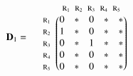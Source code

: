 \documentclass[a4paper,10pt]{article}
\begin{document}
\begin{equation*}
\mathbf{D}_1 = \; \; \; \; \; \begin{matrix}
 & 

\begin{matrix}
\text{\scriptsize $\mathrm{R}_1$} \!\!\! & 
\text{\scriptsize $\mathrm{R}_2$} \!\!\! & 
\text{\scriptsize $\mathrm{R}_3$} \!\!\! & 
\text{\scriptsize $\mathrm{R}_4$} \!\!\! & 
\text{\scriptsize $\mathrm{R}_5$}
\end{matrix}

\\ 

\begin{matrix*}[l]
\text{\scriptsize $\mathrm{R}_1$} \!\!\! \\
\text{\scriptsize $\mathrm{R}_2$} \!\!\! \\
\text{\scriptsize $\mathrm{R}_3$} \!\!\! \\
\text{\scriptsize $\mathrm{R}_4$} \!\!\! \\
\text{\scriptsize $\mathrm{R}_5$} \!\!\!
\end{matrix*}

& 

\begin{pmatrix}
0 & * & 0 & * & * \\
1 & * & 0 & * & * \\
0 & * & 1 & * & * \\
0 & * & 0 & * & * \\
0 & * & 0 & * & *
\end{pmatrix}

\end{matrix}
\end{equation*}

\bigskip
\end{document}
